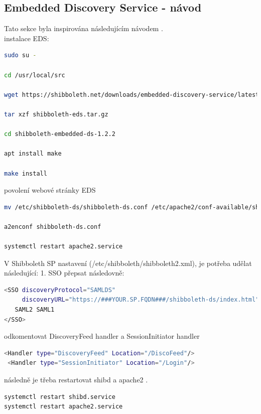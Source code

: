 \subsection{Embedded Discovery Service - návod}
Tato sekce byla inspirována následujícím návodem \cite{EDS-tut}. \\
instalace EDS:
\begin{lstlisting}[language=Bash]
  sudo su -

cd /usr/local/src

wget https://shibboleth.net/downloads/embedded-discovery-service/latest/shibboleth-embedded-ds-1.2.2.tar.gz -O shibboleth-eds.tar.gz

tar xzf shibboleth-eds.tar.gz

cd shibboleth-embedded-ds-1.2.2

apt install make

make install
\end{lstlisting}

povolení webové stránky EDS

\begin{lstlisting}[language=Bash]
mv /etc/shibboleth-ds/shibboleth-ds.conf /etc/apache2/conf-available/shibboleth-ds.conf

a2enconf shibboleth-ds.conf

systemctl restart apache2.service
\end{lstlisting}

V Shibboleth SP nastavení (/etc/shibboleth/shibboleth2.xml), je potřeba udělat následující:
1. SSO přepsat následovně:

\begin{lstlisting}[language=Bash]
<SSO discoveryProtocol="SAMLDS" 
     discoveryURL="https://###YOUR.SP.FQDN###/shibboleth-ds/index.html">
   SAML2 SAML1
</SSO>
\end{lstlisting}

odkomentovat DiscoveryFeed handler a SessionInitiator handler

\begin{lstlisting}[language=Bash]
<Handler type="DiscoveryFeed" Location="/DiscoFeed"/>
 <Handler type="SessionInitiator" Location="/Login"/>
\end{lstlisting}

následně je třeba restartovat shibd a apache2 .

\begin{lstlisting}[language=Bash]
systemctl restart shibd.service
systemctl restart apache2.service
\end{lstlisting}

